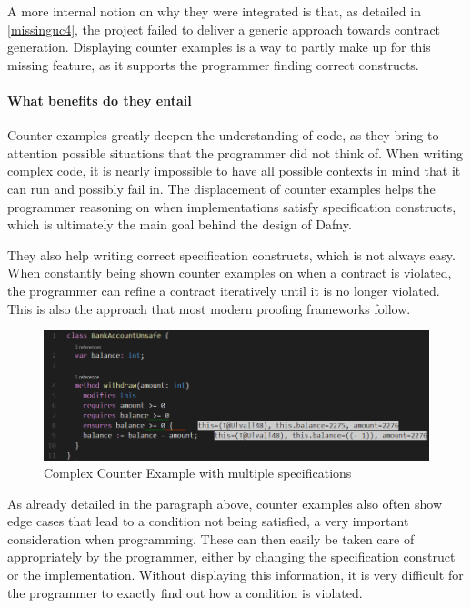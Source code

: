 A more internal notion on why they were integrated is that, as detailed in \ref{missinguc4}, the project failed to deliver a generic approach towards contract generation. Displaying counter examples is a way to partly make up for this missing feature, as it supports the programmer finding correct constructs. 

\paragraph{What benefits do they entail}
Counter examples greatly deepen the understanding of code, as they bring to attention possible situations that the programmer did not think of. When writing complex code, it is nearly impossible to have all possible contexts in mind that it can run and possibly fail in. The displacement of counter examples helps the programmer reasoning on when implementations satisfy specification constructs, which is ultimately the main goal behind the design of Dafny. \newline

They also help writing correct specification constructs, which is not always easy. When constantly being shown counter examples on when a contract is violated, the programmer can refine a contract iteratively until it is no longer violated. This is also the approach that most modern proofing frameworks follow. \newline

\begin{figure}[H]
	\centering
	\includegraphics[width=1\textwidth]{img/counterModelBank}
	\caption{Complex Counter Example with multiple specifications}
	\label{fig:dfcounterModelBank}
\end{figure}

As already detailed in the paragraph above, counter examples also often show edge cases that lead to a condition not being satisfied, a very important consideration when programming. These can then easily be taken care of appropriately by the programmer, either by changing the specification construct or the implementation. Without displaying this information, it is very difficult for the programmer to exactly find out how a condition is violated. \newline

